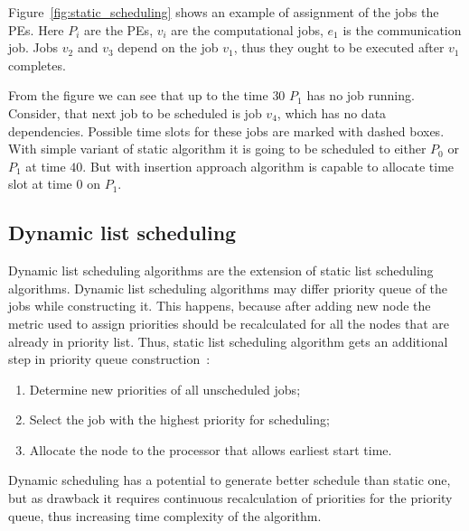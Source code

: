 Figure~\ref{fig:static_scheduling} shows an example of assignment of
the jobs the PEs. Here $P_i$ are the PEs, $v_i$ are the computational
jobs, $e_1$ is the communication job. Jobs $v_2$ and $v_3$ depend on
the job $v_1$, thus they ought to be executed after $v_1$
completes.

From the figure we can see that up to the time $30$ $P_1$ has no job
running. Consider, that next job to be scheduled is job $v_4$, which
has no data dependencies. Possible time slots for these jobs are
marked with dashed boxes. With simple variant of static algorithm it
is going to be scheduled to either $P_0$ or $P_1$ at time $40$. But
with insertion approach algorithm is capable to allocate time slot at
time 0 on $P_1$.

\subsection{Dynamic list scheduling}
\label{sec:dynamic}

Dynamic list scheduling algorithms are the extension of static list
scheduling algorithms. Dynamic list scheduling algorithms may differ
priority queue of the jobs while constructing it. This happens,
because after adding new node the metric used to assign priorities
should be recalculated for all the nodes that are already in priority
list. Thus, static list scheduling algorithm gets an additional step
in priority queue construction~\cite{kwok1999static}:

\begin{enumerate}
\item Determine new priorities of all unscheduled jobs;
\item Select the job with the highest priority for scheduling;
\item Allocate the node to the processor that allows earliest start
  time.
\end{enumerate}

Dynamic scheduling has a potential to generate better schedule than
static one, but as drawback it requires continuous recalculation of
priorities for the priority queue, thus increasing time complexity of
the algorithm.




